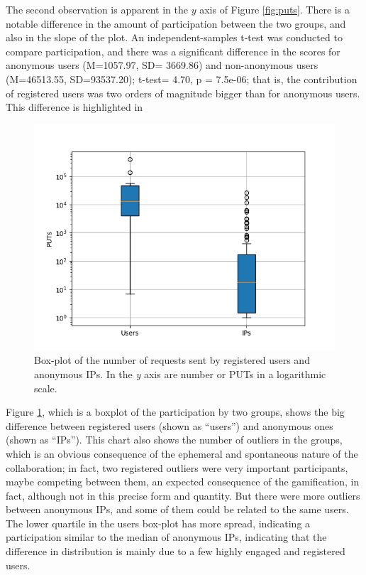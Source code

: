 \documentclass{llncs}
\begin{document}
The second observation is apparent in the $y$ axis of Figure
\ref{fig:puts}. There is a notable difference in the amount of
participation between the two groups, and also in the slope of the
plot.  An independent-samples t-test was conducted to compare
participation, and there was a significant difference in the scores
for anonymous users  (M=1057.97, SD= 3669.86) and non-anonymous users
(M=46513.55, SD=93537.20); t-test= 4.70, p = 7.5e-06; that is, the
contribution of registered users was two orders of magnitude bigger
than for anonymous users. This difference is highlighted in 
%
%
%           
%
%
\begin{figure}[htb]
    \centering
        \includegraphics[width=5in]{img/puts_box.png}
    \caption{Box-plot of the number of requests sent by registered users and anonymous IPs.
     In the \emph{y} axis are number or PUTs in a logarithmic scale.
    }
    \label{fig:box}
\end{figure}
%
 Figure \ref{fig:box}, which is a boxplot of the  participation by two
 groups, shows the big difference between registered users (shown as
 ``users'') and anonymous ones (shown as ``IPs''). This chart also
 shows the number of outliers in the groups, which is an obvious
 consequence of the ephemeral and spontaneous nature of the
 collaboration; in fact, two registered
outliers were very important participants, maybe competing between
them, an expected consequence of the gamification, in fact, although
not in this precise form and quantity. But
there were more outliers between anonymous IPs, and some of them could
be related to the same users. The lower quartile in the users box-plot
has more 
spread, indicating a participation similar to the median of anonymous
IPs, indicating that the difference in distribution is mainly due to a
few highly engaged and registered users. 
\end{document}
